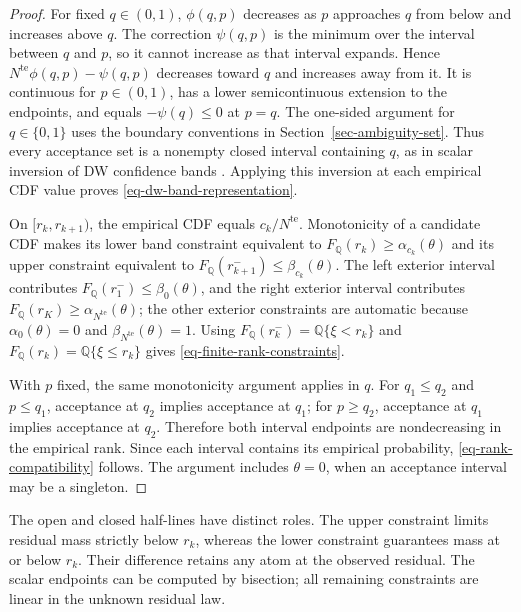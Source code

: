 \begin{proof}
  For fixed $q\in(0,1)$, $\phi(q,p)$ decreases as $p$ approaches $q$ from below and increases above $q$. The correction $\psi(q,p)$ is the minimum over the interval between $q$ and $p$, so it cannot increase as that interval expands. Hence $N^{\mathrm{te}}\phi(q,p)-\psi(q,p)$ decreases toward $q$ and increases away from it. It is continuous for $p\in(0,1)$, has a lower semicontinuous extension to the endpoints, and equals $-\psi(q)\le0$ at $p=q$. The one-sided argument for $q\in\{0,1\}$ uses the boundary conventions in Section~\ref{sec-ambiguity-set}. Thus every acceptance set is a nonempty closed interval containing $q$, as in scalar inversion of DW confidence bands \citep[Supplement, Section~S.6]{L.J23}. Applying this inversion at each empirical CDF value proves \eqref{eq-dw-band-representation}.

  On $[r_k,r_{k+1})$, the empirical CDF equals $c_k/N^{\mathrm{te}}$. Monotonicity of a candidate CDF makes its lower band constraint equivalent to $F_{\mathbb Q}(r_k)\ge\alpha_{c_k}(\theta)$ and its upper constraint equivalent to $F_{\mathbb Q}(r_{k+1}^-)\le\beta_{c_k}(\theta)$. The left exterior interval contributes $F_{\mathbb Q}(r_1^-)\le\beta_0(\theta)$, and the right exterior interval contributes $F_{\mathbb Q}(r_K)\ge\alpha_{N^{\mathrm{te}}}(\theta)$; the other exterior constraints are automatic because $\alpha_0(\theta)=0$ and $\beta_{N^{\mathrm{te}}}(\theta)=1$. Using $F_{\mathbb Q}(r_k^-)=\mathbb Q\{\xi<r_k\}$ and $F_{\mathbb Q}(r_k)=\mathbb Q\{\xi\le r_k\}$ gives \eqref{eq-finite-rank-constraints}.

  With $p$ fixed, the same monotonicity argument applies in $q$. For $q_1\le q_2$ and $p\le q_1$, acceptance at $q_2$ implies acceptance at $q_1$; for $p\ge q_2$, acceptance at $q_1$ implies acceptance at $q_2$. Therefore both interval endpoints are nondecreasing in the empirical rank. Since each interval contains its empirical probability, \eqref{eq-rank-compatibility} follows. The argument includes $\theta=0$, when an acceptance interval may be a singleton.
\end{proof}

The open and closed half-lines have distinct roles. The upper constraint limits residual mass strictly below $r_k$, whereas the lower constraint guarantees mass at or below $r_k$. Their difference retains any atom at the observed residual. The scalar endpoints can be computed by bisection; all remaining constraints are linear in the unknown residual law.

